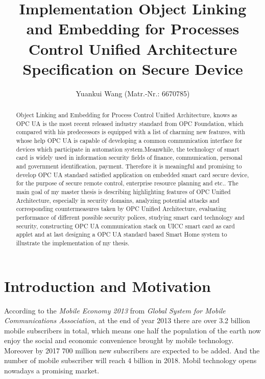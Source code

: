\documentclass[]{llncs}
\begin{document}
\title{Implementation Object Linking and Embedding for Processes Control Unified Architecture Specification on Secure Device} %
\author{Yuankui Wang (Matr.-Nr.: 6670785)}

\maketitle

\begin{abstract}

Object Linking and Embedding for Process Control Unified Architecture, knows as OPC UA is the most recent released industry standard from OPC Foundation, which compared with his predecessors is equipped with a list of charming new features, with whose help OPC UA is capable of developing a common communication interface for devices which participate in automation system.Meanwhile, the technology of smart card is widely used in information security fields of finance, communication, personal and government identification, payment. Therefore it is meaningful and promising to develop OPC UA standard satisfied application on embedded smart card secure device, for the purpose of secure remote control, enterprise resource planning and etc.. The main goal of my master thesis is describing highlighting features of OPC Unified Architecture, especially in security domains, analyzing potential attacks and corresponding countermeasures taken by OPC Unified Architecture, evaluating performance of different possible security polices, studying smart card technology and security, constructing OPC UA communication stack on UICC smart card as card applet and at last designing a OPC UA standard based Smart Home system to illustrate the implementation of my thesis. 

\end{abstract}

\section{Introduction and Motivation}
According to the \emph{Mobile Economy 2013} from \emph{Global System for Mobile Communications Association}, at the end of year 2013 there are over 3.2 billion mobile   subscribers in total, which means one half the population of the earth now enjoy the social and economic convenience brought by mobile technology. Moreover by 2017 700 million new subscribers are expected to be added. And the number of mobile subscriber will reach 4 billion in 2018. Mobil technology opens nowadays a promising market. 
\end{document}
